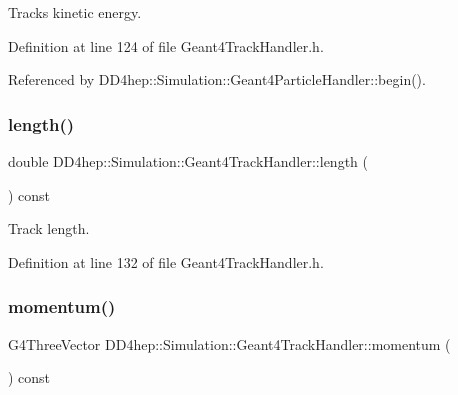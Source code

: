 Track\textquotesingle{}s kinetic energy. 



Definition at line 124 of file Geant4\+Track\+Handler.\+h.



Referenced by D\+D4hep\+::\+Simulation\+::\+Geant4\+Particle\+Handler\+::begin().

\hypertarget{class_d_d4hep_1_1_simulation_1_1_geant4_track_handler_af2567747abef792c86729878fdecfe4d}{}\label{class_d_d4hep_1_1_simulation_1_1_geant4_track_handler_af2567747abef792c86729878fdecfe4d} 
\subsubsection{\texorpdfstring{length()}{length()}}
{\footnotesize\ttfamily double D\+D4hep\+::\+Simulation\+::\+Geant4\+Track\+Handler\+::length (\begin{DoxyParamCaption}{ }\end{DoxyParamCaption}) const\hspace{0.3cm}{\ttfamily [inline]}}



Track length. 



Definition at line 132 of file Geant4\+Track\+Handler.\+h.

\hypertarget{class_d_d4hep_1_1_simulation_1_1_geant4_track_handler_af184b1eae4fe7d2da7d9579922514d1b}{}\label{class_d_d4hep_1_1_simulation_1_1_geant4_track_handler_af184b1eae4fe7d2da7d9579922514d1b} 
\subsubsection{\texorpdfstring{momentum()}{momentum()}}
{\footnotesize\ttfamily G4\+Three\+Vector D\+D4hep\+::\+Simulation\+::\+Geant4\+Track\+Handler\+::momentum (\begin{DoxyParamCaption}{ }\end{DoxyParamCaption}) const\hspace{0.3cm}{\ttfamily [inline]}}



